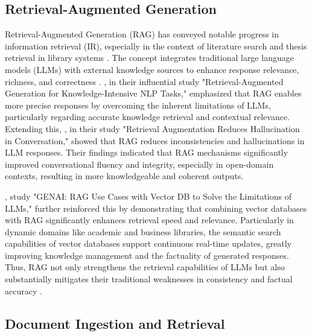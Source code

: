 \begin{refsection}
\subsection{Retrieval-Augmented Generation}

\hspace{1cm}Retrieval-Augmented Generation (RAG) has conveyed notable progress in information retrieval (IR), especially in the context of literature search and thesis retrieval in library systems \cite{thomo2024pubmed}. The concept integrates traditional large language models (LLMs) with external knowledge sources to enhance response relevance, richness, and correctness \cite{chen2024benchmarking}. \citeauthor{lewis2020retrieval} \citeyear{lewis2020retrieval}, in their influential study "Retrieval-Augmented Generation for Knowledge-Intensive NLP Tasks," emphasized that RAG enables more precise responses by overcoming the inherent limitations of LLMs, particularly regarding accurate knowledge retrieval and contextual relevance. Extending this, \citeauthor{shuster2021retrieval} \citeyear{shuster2021retrieval}, in their study "Retrieval Augmentation Reduces Hallucination in Conversation," showed that RAG reduces inconsistencies and hallucinations in LLM responses. Their findings indicated that RAG mechanisms significantly improved conversational fluency and integrity, especially in open-domain contexts, resulting in more knowledgeable and coherent outputs.

\bigbreak
\hspace{0.4cm} \citeauthor{sagi2024genai} \citeyear{sagi2024genai}, study "GENAI: RAG Use Cases with Vector DB to Solve the Limitations of LLMs," further reinforced this by demonstrating that combining vector databases with RAG significantly enhances retrieval speed and relevance. Particularly in dynamic domains like academic and business libraries, the semantic search capabilities of vector databases support continuous real-time updates, greatly improving knowledge management and the factuality of generated responses. Thus, RAG not only strengthens the retrieval capabilities of LLMs but also substantially mitigates their traditional weaknesses in consistency and factual accuracy \cite{sagi2024genai}.


\subsection{Document Ingestion and Retrieval}


\end{refsection}
